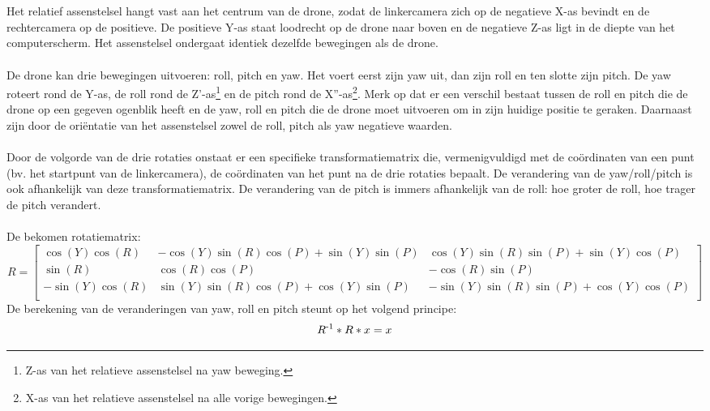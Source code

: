 \\
\\
Het relatief assenstelsel hangt vast aan het centrum van de drone, zodat de linkercamera zich op de negatieve X-as bevindt en de rechtercamera op de positieve. De positieve Y-as staat loodrecht op de drone naar boven en de negatieve Z-as ligt in de diepte van het computerscherm. Het assenstelsel ondergaat identiek dezelfde bewegingen als de drone.
\\
\\
De drone kan drie bewegingen uitvoeren: roll, pitch en yaw. Het voert eerst zijn yaw uit, dan zijn roll en ten slotte zijn pitch. De yaw roteert rond de Y-as, de roll rond de Z'-as\footnote{Z-as van het relatieve assenstelsel na yaw beweging.} en de pitch rond de X''-as\footnote{X-as van het relatieve assenstelsel na alle vorige bewegingen.}. Merk op dat er een verschil bestaat tussen de roll en pitch die de drone op een gegeven ogenblik heeft en de yaw, roll en pitch die de drone moet uitvoeren om in zijn huidige positie te geraken. Daarnaast zijn door de ori\"entatie van het assenstelsel zowel de roll, pitch als yaw negatieve waarden.
\\
\\
Door de volgorde van de drie rotaties onstaat er een specifieke transformatiematrix die, vermenigvuldigd met de coördinaten van een punt (bv. het startpunt van de linkercamera), de coördinaten van het punt na de drie rotaties bepaalt. De verandering van de yaw/roll/pitch is ook afhankelijk van deze transformatiematrix. De verandering van de pitch is immers afhankelijk van de roll: hoe groter de roll, hoe trager de pitch verandert. 
\\
\\
De bekomen rotatiematrix:
\begin{equation*}
R = 
\begin{bmatrix}
\cos(Y)\cos(R) & -\cos(Y)\sin(R)\cos(P) + \sin(Y)\sin(P) & \cos(Y)\sin(R)\sin(P)+\sin(Y)\cos(P) \\
\sin(R) & \cos(R)\cos(P) & -\cos(R)\sin(P) \\ 
-\sin(Y)\cos(R) & \sin(Y)\sin(R)\cos(P)+\cos(Y)\sin(P) & -\sin(Y)\sin(R)\sin(P)+\cos(Y)\cos(P)\\
\end{bmatrix}
\end{equation*}
De berekening van de veranderingen van yaw, roll en pitch steunt op het volgend principe: 
\begin{equation*}
R\textsuperscript{-1} * R * x = x
\end{equation*} 
